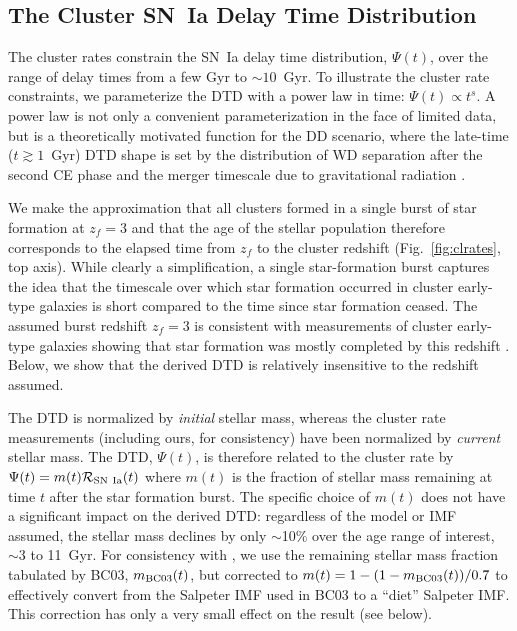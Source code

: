 \subsection{The Cluster SN~Ia Delay Time Distribution} \label{conclusionsdtd}

The cluster rates constrain the SN~Ia delay time distribution,
$\Psi(t)$, over the range of delay times from a few Gyr to $\sim
10$~Gyr. To illustrate the cluster rate constraints, we parameterize
the DTD with a power law in time: $\Psi(t) \propto t^s$. A power law
is not only a convenient parameterization in the face of limited data,
but is a theoretically motivated function for the DD scenario, where
the late-time ($t \gtrsim 1$~Gyr) DTD shape is set by the distribution
of WD separation after the second CE phase and the merger timescale
due to gravitational radiation \citep{greggio05a}.

We make the approximation that all clusters formed in a single burst
of star formation at $z_f = 3$ and that the age of the stellar
population therefore corresponds to the elapsed time from $z_f$ to the
cluster redshift (Fig.~\ref{fig:clrates}, top axis). While
clearly a simplification, a single star-formation burst captures the
idea that the timescale over which star formation occurred in cluster
early-type galaxies is short compared to the time since star formation
ceased.  The assumed burst redshift $z_f = 3$ is consistent with
measurements of cluster early-type galaxies showing that star
formation was mostly completed by this redshift
\citep[e.g.,][]{gobat08a}. Below, we show that the derived DTD is
relatively insensitive to the redshift assumed.

The DTD is normalized by \emph{initial} stellar mass, whereas the
cluster rate measurements (including ours, for consistency) have been
normalized by \emph{current} stellar mass.  The DTD, $\Psi(t)$, is
therefore related to the cluster rate by $\Psi(t)=m(t)\mathcal{R}_{\rm
  SN~Ia}(t)$ where $m(t)$ is the fraction of stellar mass remaining at
time $t$ after the star formation burst. The specific choice of $m(t)$
does not have a significant impact on the derived DTD: regardless of
the model or IMF assumed, the stellar mass declines by only $\sim$10\%
over the age range of interest, $\sim 3$ to 11~Gyr. For consistency
with \citet{maoz10c}, we use the remaining stellar mass fraction tabulated by
BC03, $m_{\rm BC03}(t)$, but corrected to $m(t) = 1 - (1 - m_{\rm
  BC03}(t))/0.7$ to effectively convert from the Salpeter IMF used in
BC03 to a ``diet'' Salpeter IMF. This correction has only a very small
effect on the result (see below).

